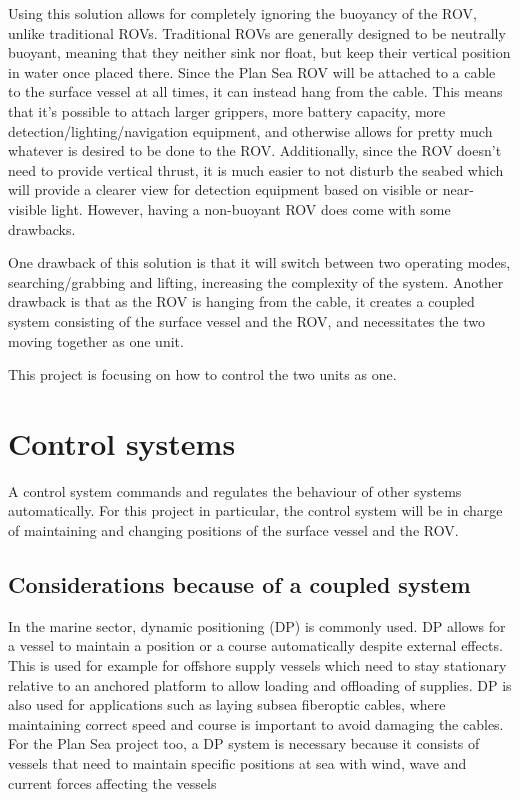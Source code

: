 Using this solution allows for completely ignoring the buoyancy of the ROV, unlike traditional ROVs. Traditional ROVs are generally designed to be neutrally buoyant, meaning that they neither sink nor float, but keep their vertical position in water once placed there. Since the Plan Sea ROV will be attached to a cable to the surface vessel at all times, it can instead hang from the cable. This means that it's possible to attach larger grippers, more battery capacity, more detection/lighting/navigation equipment, and otherwise allows for pretty much whatever is desired to be done to the ROV. Additionally, since the ROV doesn't need to provide vertical thrust, it is much easier to not disturb the seabed which will provide a clearer view for detection equipment based on visible or near-visible light. However, having a non-buoyant ROV does come with some drawbacks.

One drawback of this solution is that it will switch between two operating modes, searching/grabbing and lifting, increasing the complexity of the system. Another drawback is that as the ROV is hanging from the cable, it creates a coupled system consisting of the surface vessel and the ROV, and necessitates the two moving together as one unit. 

This project is focusing on how to control the two units as one. 

\section{Control systems}
A control system commands and regulates the behaviour of other systems automatically. For this project in particular, the control system will be in charge of maintaining and changing positions of the surface vessel and the ROV. 

\subsection{Considerations because of a coupled system}
In the marine sector, dynamic positioning (DP) is commonly used. DP allows for a vessel to maintain a position or a course automatically despite external effects. This is used for example for offshore supply vessels which need to stay stationary relative to an anchored platform to allow loading and offloading of supplies. DP is also used for applications such as laying subsea fiberoptic cables, where maintaining correct speed and course is important to avoid damaging the cables. For the Plan Sea project too, a DP system is necessary because it consists of vessels that need to maintain specific positions at sea with wind, wave and current forces affecting the vessels


